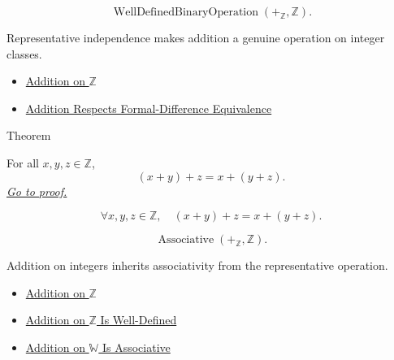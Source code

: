 \begin{remark*}
\[
\operatorname{WellDefinedBinaryOperation}(+_{\mathbb{Z}},\mathbb{Z}).
\]
\end{remark*}

\begin{remark*}[Interpretation]
Representative independence makes addition a genuine operation on integer
classes.
\end{remark*}

\begin{dependencies}
\begin{itemize}
  \item \hyperref[def:addition-on-z-classes]{Addition on $\mathbb{Z}$}
  \item \hyperref[lem:addition-on-z-classes-respects-equivalence]{Addition Respects Formal-Difference Equivalence}
\end{itemize}
\end{dependencies}

\begin{theorembox}{Theorem}
\begin{theorem}
\label{thm:addition-on-z-associative}
For all $x,y,z\in\mathbb{Z}$,
\[
(x+y)+z=x+(y+z).
\]
\hyperref[prf:addition-on-z-associative]{\textit{Go to proof.}}
\end{theorem}
\end{theorembox}

\begin{remark*}
\[
\forall x,y,z\in\mathbb{Z},\quad
(x+y)+z=x+(y+z).
\]
\end{remark*}

\begin{remark*}
\[
\operatorname{Associative}(+_{\mathbb{Z}},\mathbb{Z}).
\]
\end{remark*}

\begin{remark*}[Interpretation]
Addition on integers inherits associativity from the representative operation.
\end{remark*}

\begin{dependencies}
\begin{itemize}
  \item \hyperref[def:addition-on-z-classes]{Addition on $\mathbb{Z}$}
  \item \hyperref[thm:addition-on-z-well-defined]{Addition on $\mathbb{Z}$ Is Well-Defined}
  \item \hyperref[thm:addition-on-w-associative]{Addition on $\mathbb{W}$ Is Associative}
\end{itemize}
\end{dependencies}

